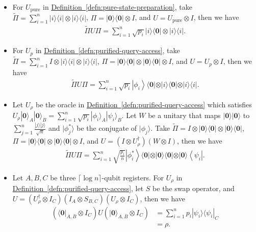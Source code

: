 \documentclass[journal]{IEEEtran}
\newcommand{\defn}[1]{\hyperref[defn:#1]{Definition~\ref*{defn:#1}}}
\begin{document}
\begin{itemize}
    \item For $U_{\mathrm{pure}}$ in \defn{pure-state-preparation}, take $\widetilde{\Pi }=\sum_{i=1}^{n} |i\rangle\langle i| \otimes|i\rangle\langle i|$, $\Pi=|\mathbf{0}\rangle\langle \mathbf{0}|\otimes I$, and $U = U_{\mathrm{pure}} \otimes I$, then we have 
    \begin{align}
      \label{eq:block-1}
        \widetilde{\Pi}U\Pi =\sum_{i=1}^{n}\sqrt{p_{i}}|i\rangle \langle \mathbf{0}|\otimes |i\rangle \langle i|.
    \end{align}
    \item For $U_p$ in \defn{purified-query-access}, take $\widetilde{\Pi}=\sum_{i=1}^{n} I \otimes|i\rangle\langle i|\otimes| i\rangle\langle i|$, $\Pi=|\mathbf{0}\rangle\langle \mathbf{0}|\otimes| \mathbf{0}\rangle\langle \mathbf{0}| \otimes I$, and $U=U_{p} \otimes I$, then we have
    \begin{align}
      \label{eq:block-2}
     \widetilde{\Pi} U \Pi=\sum_{i=1}^{n} \sqrt{p_{i}}\left|\phi_{i}\right\rangle\langle \mathbf{0}|\otimes| i\rangle\langle \mathbf{0}|\otimes| i\rangle\langle i|.
    \end{align}
\item Let $U_\rho$ be the oracle in \defn{purified-query-access} which satisfies $U_{\rho}|\mathbf{0}\rangle_A|\mathbf{0}\rangle_B = \sum_{i=1}^n\sqrt{p_i} |\phi_i\rangle_A|\psi_i\rangle_B$.
    Let $W$ be a unitary that maps $|\mathbf{0}\rangle|\mathbf{0}\rangle$ to $\sum_{j=1}^n \frac{|j\rangle|j\rangle}{\sqrt{n}}$ and $|\phi_{j}^*\rangle $ be the conjugate of $|\phi_j\rangle$. Take $\widetilde{\Pi}=I \otimes|\mathbf{0}\rangle\langle \mathbf{0}|\otimes| \mathbf{0}\rangle\langle \mathbf{0}|$, $\Pi=|\mathbf{0}\rangle\langle \mathbf{0}|\otimes| \mathbf{0}\rangle\langle \mathbf{0}| \otimes I$, and $U=\left(I \otimes U_{\rho}^{\dagger}\right)\left(W\otimes I\right)$, then we have
    \begin{align}
      \label{eq:block-3}
      \widetilde{\Pi}U\Pi=\sum_{i=1}^n \sqrt{\frac{p_i}{n}}\left|\phi_i^{*}\right\rangle\langle \mathbf{0}|\otimes| \mathbf{0}\rangle\langle \mathbf{0}|\otimes| \mathbf{0}\rangle\left\langle\psi_i\right|.
    \end{align} 
    \item Let $A,B,C$ be three $\lceil \log n\rceil$-qubit registers. For $U_\rho$ in \defn{purified-query-access}, let $S$ be the swap operator, and $U= (U_{\rho}^{\dagger}\otimes I_C)(I_A\otimes S_{B,C})(U_{\rho}\otimes I_C)$, then we have
    \begin{align}
      \label{eq:block-4}
      (\langle\mathbf{0}|_{A,B}\otimes I_C)U(|\mathbf{0}\rangle_{A,B}\otimes I_C) &= \sum_{i=1}^n p_i|\psi_i\rangle\langle \psi_i|_C \nonumber\\&= \rho.
    \end{align}
\end{itemize}
\end{document}
